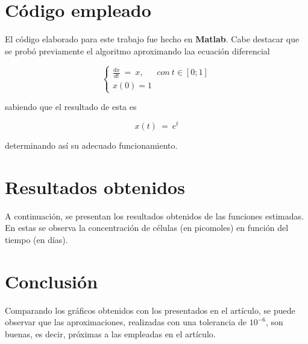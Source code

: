 \documentclass[a4paper]{article}
\begin{document}
\section{Código empleado}
El código elaborado para este trabajo fue hecho en \textbf{Matlab}.
Cabe destacar que se probó previamente el algoritmo aproximando laa ecuación diferencial

\[\left\{
  \begin{array}{lr}
    \frac{dx}{dt} \ = \ x, \ \ \ \ \ \ \ con \ t \in [0;1]\\
    x(0) = 1
  \end{array}
\right.
\]

sabiendo que el resultado de esta es

\[ x(t) \ = \ e^t \]

determinando así su adecuado funcionamiento.
	
	
	
\section{Resultados obtenidos}
A continuación, se presentan los resultados obtenidos de las funciones estimadas. En estas se observa la concentración de células (en picomoles) en función del tiempo (en días). 



\section{Conclusión}
Comparando los gráficos obtenidos con los presentados en el artículo, se puede observar que las aproximaciones, realizadas con una tolerancia de $10^{-6}$, son buenas, es decir, próximas a las empleadas en el artículo. 	
 
\end{document}
